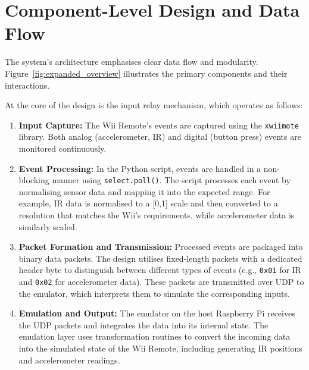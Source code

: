 \section{Component-Level Design and Data Flow}

The system’s architecture emphasises clear data flow and modularity. Figure~\ref{fig:expanded_overview} illustrates the primary components and their interactions.


At the core of the design is the input relay mechanism, which operates as follows:

\begin{enumerate}
	\item \textbf{Input Capture:}
	      The Wii Remote’s events are captured using the \texttt{xwiimote} library. Both analog (accelerometer, IR) and digital (button press) events are monitored continuously.

	\item \textbf{Event Processing:}
	      In the Python script, events are handled in a non-blocking manner using \texttt{select.poll()}. The script processes each event by normalising sensor data and mapping it into the expected range. For example, IR data is normalised to a [0,1] scale and then converted to a resolution that matches the Wii’s requirements, while accelerometer data is similarly scaled.

	\item \textbf{Packet Formation and Transmission:}
	      Processed events are packaged into binary data packets. The design utilises fixed-length packets with a dedicated header byte to distinguish between different types of events (e.g., \texttt{0x01} for IR and \texttt{0x02} for accelerometer data). These packets are transmitted over UDP to the emulator, which interprets them to simulate the corresponding inputs.

	\item \textbf{Emulation and Output:}
	      The emulator on the host Raspberry Pi receives the UDP packets and integrates the data into its internal state. The emulation layer uses transformation routines to convert the incoming data into the simulated state of the Wii Remote, including generating IR positions and accelerometer readings.
\end{enumerate}

